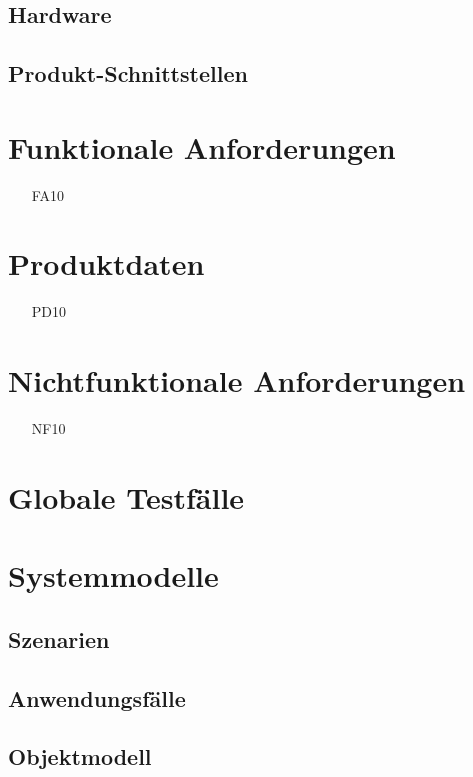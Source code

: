 \documentclass[titlepage=true, parskip=full]{scrartcl}
\begin{document}
\subsection{Hardware}

\subsection{Produkt-Schnittstellen}

\section{Funktionale Anforderungen}
\begin{itemize}[nosep]
	\item[FA10]
\end{itemize}

\section{Produktdaten}
\begin{itemize}[nosep]
	\item[PD10]
\end{itemize}

\section{Nichtfunktionale Anforderungen}
\begin{itemize}[nosep]
\item[NF10]
\end{itemize}

\section{Globale Testfälle}
\section{Systemmodelle}

\subsection{Szenarien}

\subsection{Anwendungsfälle}

\subsection{Objektmodell}
\end{document}
